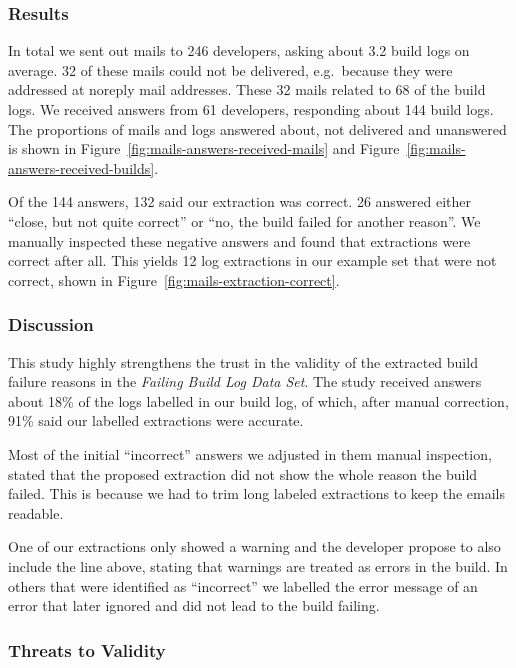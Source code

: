 \documentclass[\myrootdir/main.tex]{subfiles}
\begin{document}
\subsubsection{Results}
In total we sent out mails to 246 developers, asking about 3.2 build logs on average.
32 of these mails could not be delivered, e.g.\ because they were addressed at noreply mail addresses.
These 32 mails related to 68 of the build logs.
We received answers from 61 developers, responding about 144 build logs.
The proportions of mails and logs answered about, not delivered and unanswered is shown in Figure~\ref{fig:mails-answers-received-mails} and Figure~\ref{fig:mails-answers-received-builds}.

Of the 144 answers, 132 said our extraction was correct.
26 answered either ``close, but not quite correct'' or ``no, the build failed for another reason''.
We manually inspected these negative answers and found that extractions were correct after all.
This yields 12 log extractions in our example set that were not correct, shown in Figure~\ref{fig:mails-extraction-correct}.

\subsubsection{Discussion}
This study highly strengthens the trust in the validity of the extracted build failure reasons in the \emph{Failing Build Log Data Set}.
The study received answers about 18\% of the logs labelled in our build log, of which, after manual correction, 91\% said our labelled extractions were accurate.

Most of the initial ``incorrect'' answers we adjusted in them manual inspection, stated that the proposed extraction did not show the whole reason the build failed.
This is because we had to trim long labeled extractions to keep the emails readable.

One of our extractions only showed a warning and the developer propose to also include the line above, stating that warnings are treated as errors in the build.
In others that were identified as ``incorrect'' we labelled the error message of an error that later ignored and did not lead to the build failing.

\subsubsection{Threats to Validity}
\end{document}
